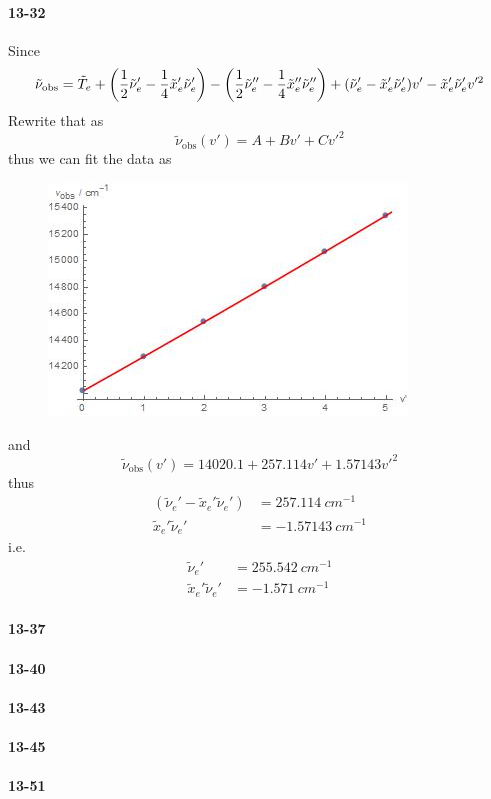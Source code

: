 \documentclass[a4paper]{article}
\newcommand{\ex}[1]{\paragraph{13-#1}}
\numberwithin{equation}{section}
\begin{document}
\ex{32}
Since
\begin{equation}\label{key}
\tilde{\nu}_{\text{obs}} = \tilde{T}_e + \qty(\dfrac{1}{2}\tilde{\nu}_e' - \dfrac{1}{4}\tilde{x}_e'\tilde{\nu}_e') - \qty(\dfrac{1}{2}\tilde{\nu}_e'' - \dfrac{1}{4}\tilde{x}_e''\tilde{\nu}_e'') + \qty(\tilde{\nu}_e' - \tilde{x}_e'\tilde{\nu}_e')v' - \tilde{x}_e'\tilde{\nu}_e'v'^2
\end{equation}
Rewrite that as
\begin{equation}\label{key}
\tilde{\nu}_{\text{obs}}(v') = A + Bv' + Cv'^2
\end{equation}
thus we can fit the data as
\begin{figure}[H]
	\centering
	\includegraphics[width=0.5\linewidth]{chap13-32.jpg}
\end{figure}
and
\begin{equation}\label{key}
\tilde{\nu}_{\text{obs}}(v') = 14020.1 + 257.114 v' + 1.57143 v'^2
\end{equation}
thus
\begin{align}
(\tilde{\nu}_e' - \tilde{x}_e'\tilde{\nu}_e') &= \SI{257.114}{cm^{-1}}\\
\tilde{x}_e'\tilde{\nu}_e' &= \SI{-1.57143}{cm^{-1}}
\end{align}
i.e.
\begin{align}
\tilde{\nu}_e' &= \SI{255.542}{cm^{-1}}\\
\tilde{x}_e'\tilde{\nu}_e' &= \SI{-1.571}{cm^{-1}}
\end{align}

\ex{37}

\ex{40}

\ex{43}

\ex{45}

\ex{51}
\end{document}
